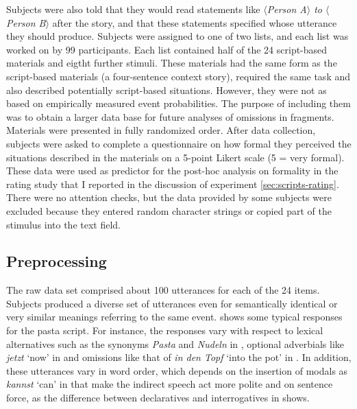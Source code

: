 Subjects were also told that they would read statements like \textit{$\langle$Person A$\rangle$ to $\langle$Person B$\rangle$} after the story, and that these statements specified whose utterance they should produce. Subjects were assigned to one of two lists, and each list was worked on by 99 participants. Each list contained half of the 24 script-based materials and eigtht further stimuli. These materials had the same form as the script-based materials (a four-sentence context story), required the same task and also described potentially script-based situations. However, they were not as based on empirically measured event probabilities. The purpose of including them was to obtain a larger data base for future analyses of omissions in fragments. Materials were presented in fully randomized order. After data collection, subjects were asked to complete a questionnaire on how formal they perceived the situations described in the materials on a 5-point Likert scale (5 = very formal). These data were used as predictor for the post-hoc analysis on formality in the rating study that I reported in the discussion of experiment \ref{sec:scripts-rating}. There were no attention checks, but the data provided by some subjects were excluded because they entered random character strings or copied part of the stimulus into the text field.

\subsection{Preprocessing} \label{sec:scripts-production-annotation}

The raw data set comprised about 100 utterances for each of the 24 items. Subjects produced a diverse set of utterances even for semantically identical or very similar meanings referring to the same event. \Next shows some typical responses for the pasta script. For instance, the responses vary with respect to lexical alternatives such as the synonyms \textit{Pasta} and \textit{Nudeln} in \Next[a,b], optional adverbials like \textit{jetzt} `now' in \Next[c] and omissions like that of \textit{in den Topf} `into the pot' in \Next[d]. In addition, these utterances vary in word order, which depends on the insertion of modals as \textit{kannst} `can' in \Next[a--c] that make the indirect speech act more polite and on sentence force, as the difference between declaratives and interrogatives in \Last[c,d] shows.

